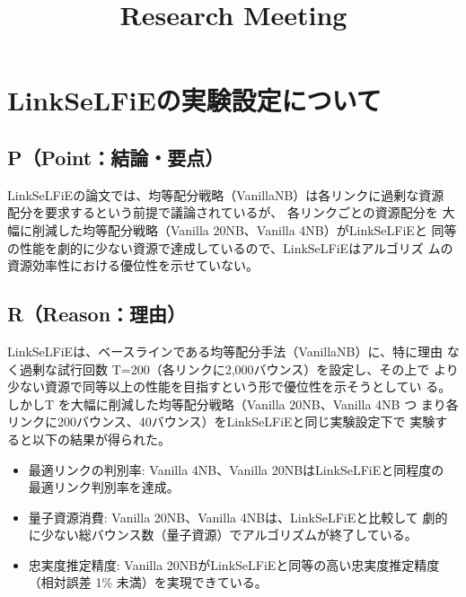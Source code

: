 \documentclass[conference]{IEEEtran}
\begin{document}
\title{Research Meeting}

\author{
}

\maketitle


\section{LinkSeLFiEの実験設定について}
\label{sec:org504e02d}
\subsection{P（Point：結論・要点）}
\label{sec:orgd0f0328}
LinkSeLFiEの論文では、均等配分戦略（VanillaNB）は各リンクに過剰な資源
配分を要求するという前提で議論されているが、 各リンクごとの資源配分を
大幅に削減した均等配分戦略（Vanilla 20NB、Vanilla 4NB）がLinkSeLFiEと
同等の性能を劇的に少ない資源で達成しているので、LinkSeLFiEはアルゴリズ
ムの資源効率性における優位性を示せていない。

\subsection{R（Reason：理由）}
\label{sec:org41a7c24}
LinkSeLFiEは、ベースラインである均等配分手法（VanillaNB）に、特に理由
なく過剰な試行回数 T=200（各リンクに2,000バウンス）を設定し、その上で
より少ない資源で同等以上の性能を目指すという形で優位性を示そうとしてい
る。しかしT を大幅に削減した均等配分戦略（Vanilla 20NB、Vanilla 4NB つ
まり各リンクに200バウンス、40バウンス）をLinkSeLFiEと同じ実験設定下で
実験すると以下の結果が得られた。

\begin{itemize}
\item 最適リンクの判別率: Vanilla 4NB、Vanilla 20NBはLinkSeLFiEと同程度の
最適リンク判別率を達成。

\item 量子資源消費: Vanilla 20NB、Vanilla 4NBは、LinkSeLFiEと比較して
劇的に少ない総バウンス数（量子資源）でアルゴリズムが終了している。

\item 忠実度推定精度: Vanilla 20NBがLinkSeLFiEと同等の高い忠実度推定精度
（相対誤差 1\% 未満）を実現できている。
\end{itemize}
\end{document}
